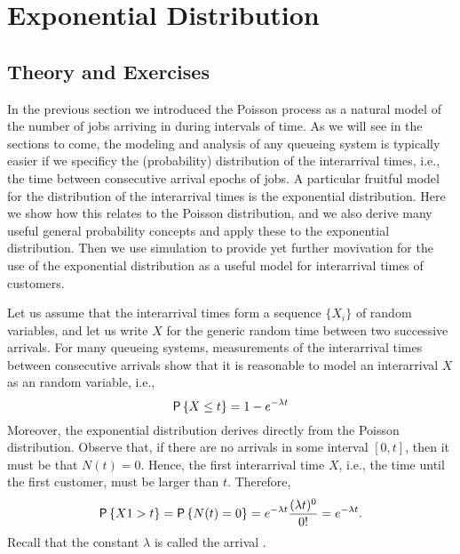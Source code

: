 \section{Exponential Distribution}
\label{sec:expon-distr}


\subsection*{Theory and Exercises}


In the previous section we introduced the Poisson process as a natural model of the number of jobs arriving in during intervals of time.  As we will see in the sections to come, the modeling and analysis of any queueing system is typically easier if we specificy  the (probability)
distribution of the interarrival times, i.e., the time between consecutive arrival epochs of jobs.
A particular fruitful model for the distribution of the interarrival times is the exponential distribution. Here we show how this relates to the Poisson distribution,  and we also derive many useful general probability concepts and apply these to the exponential distribution.  Then we use simulation to provide yet further movivation for the use of the exponential distribution as a useful model for interarrival times of customers.

Let us assume that the interarrival times form a sequence $\{X_i\}$ of   random variables, and let us write $X$ for the generic
random time between two successive arrivals. For many queueing
systems, measurements of the interarrival times between consecutive
arrivals show that it is reasonable to model an interarrival $X$ as
an  random variable, i.e.,
\begin{equation*}
  \P{X \leq t} = 1- e^{-\lambda t}
\end{equation*}
Moreover,  the exponential distribution  derives directly from the Poisson distribution. Observe that, if there are no arrivals in some interval $[0,t]$, then it
must be that $N(t) = 0$. Hence, the first interarrival time $X$, i.e., the time until the first customer,  must be larger than $t$.  Therefore,
\begin{equation*}
 \P{X1> t} = \P{N(t) = 0} = e^{-\lambda t} \frac{(\lambda t)^0}{0!}= e^{-\lambda t}.
\end{equation*}
Recall that the constant $\lambda$ is called the arrival
.  

